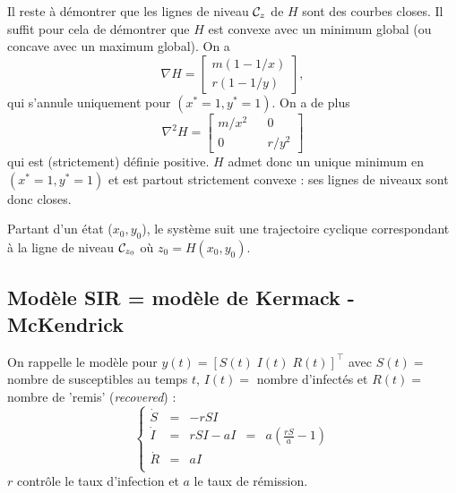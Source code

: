 \bigskip
Il reste à démontrer que les lignes de niveau $\mathcal{C}_z$ de $H$ sont des courbes closes. Il suffit pour cela de démontrer que $H$ est convexe avec un minimum global (ou concave avec un maximum global). On a
$$
\nabla H = \left[\begin{array}{c} m(1 - 1/x) \\ r(1 - 1/y)\end{array}\right], 
$$
qui s'annule uniquement pour $(x^* = 1, y^*=1)$. On a de plus
$$
\nabla^2 H = \left[\begin{array}{ccc} m/x^2 & & 0 \\ 0 & & r/y^2 \end{array}\right] 
$$
qui est (strictement) définie positive.
$H$ admet donc un unique minimum en $(x^* = 1, y^*=1)$ et est partout strictement convexe : ses lignes de niveaux sont donc closes.

\bigskip
Partant d'un état ($x_0, y_0$), le système suit une trajectoire cyclique 
correspondant à la ligne de niveau $\mathcal{C}_{z_0}$ où $z_0 = H(x_0, y_0)$.


\subsection{Modèle SIR = modèle de Kermack - McKendrick}

On rappelle le modèle pour $y(t) = [S(t) \; I(t) \; R(t)]^\top$ avec $S(t) =$ nombre de susceptibles au temps $t$, $I(t) =$ nombre d'infectés et $R(t) =$ nombre de 'remis' ({\em recovered}) :
$$
\left\{ \begin{array}{rclcl} 
\dot S & = & - r S I \\
\dot I & = & r S I - a I & = & \displaystyle{a \left(\frac{rS}a  - 1\right)} \\
\dot R & = & a I \\
\end{array} \right.
$$
$r$ contrôle le taux d'infection et $a$ le taux de rémission.

